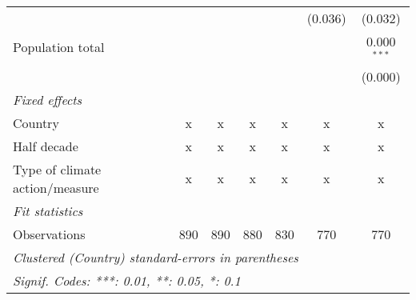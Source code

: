 \begin{tabular}{lcccccc}
                                        &         &         &         &                & (0.036)        & (0.032)\\   
   Population total                     &         &         &         &                &                & 0.000$^{***}$\\   
                                        &         &         &         &                &                & (0.000)\\   
   \emph{Fixed effects}\\
   Country                              & x       & x       & x       & x              & x              & x\\  
   Half decade                          & x       & x       & x       & x              & x              & x\\  
   Type of climate action/measure       & x       & x       & x       & x              & x              & x\\  
   \midrule \emph{Fit statistics}\\
   Observations                         & 890     & 890     & 880     & 830            & 770            & 770\\  
   \midrule
   \multicolumn{7}{l}{\emph{Clustered (Country) standard-errors in parentheses}}\\
   \multicolumn{7}{l}{\emph{Signif. Codes: ***: 0.01, **: 0.05, *: 0.1}}\\
\end{tabular}
\par\endgroup


